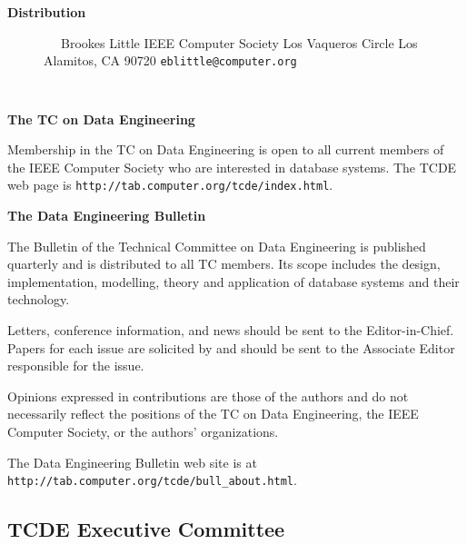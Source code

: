 \documentclass[10pt,twocolumn]{article}
\begin{document}
\begin{description}
\item[{\bf Distribution}]      
\verb-  -                      \newline
Brookes Little           \newline
IEEE Computer Society           Los Vaqueros Circle       \newline
Los Alamitos, CA 90720     \newline
\verb+eblittle@computer.org+     \newline
\vspace{-.4cm}		            
\end{description}


\verb-  -                     	\newline
\noindent
\begin{small}
{\bf The TC on Data Engineering}

Membership in the TC on Data Engineering
is open to all current members of the IEEE Computer
Society who are interested in database systems.
The TCDE web page is 
\verb+http://tab.computer.org/tcde/index.html+.

\vspace{.1cm}
\noindent 
{\bf The Data Engineering Bulletin}

The Bulletin of the Technical Committee on
Data Engineering is published quarterly and is
distributed to all TC members.  Its
scope includes the design, implementation, 
modelling, theory and application of database 
systems and their technology.  

Letters, conference information, and news
should be sent to the Editor-in-Chief.
Papers for each issue are
solicited by and should be sent to the
Associate Editor responsible for the issue.

Opinions expressed in contributions are those
of the authors and do not necessarily reflect
the positions of the TC on Data Engineering,
the IEEE Computer Society, or the authors'
organizations.

The Data Engineering Bulletin web site is at
\newline
\verb+http://tab.computer.org/tcde/bull_about.html+.
\end{small}

\newpage

\subsection*{TCDE Executive Committee}
\end{document}
